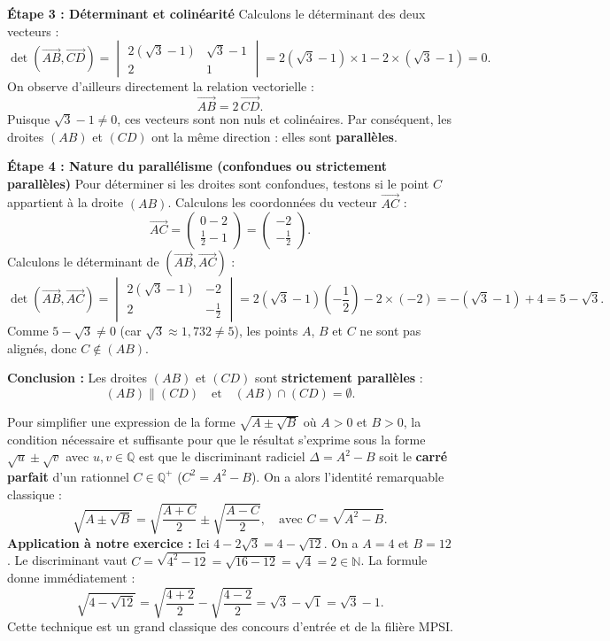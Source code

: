\documentclass[11pt,a4paper]{article}
\newcommand{\N}{\mathbb{N}}
\newcommand{\Q}{\mathbb{Q}}
\newcommand{\vect}[1]{\overrightarrow{#1}}
\renewcommand{\det}{\operatorname{det}}
\begin{document}
\begin{correctionbox}
\textbf{Étape 3 : Déterminant et colinéarité}
Calculons le déterminant des deux vecteurs :
\[
\det(\vect{AB}, \vect{CD}) = \begin{vmatrix} 2(\sqrt{3} - 1) & \sqrt{3} - 1 \\ 2 & 1 \end{vmatrix} = 2(\sqrt{3} - 1) \times 1 - 2 \times (\sqrt{3} - 1) = 0.
\]
On observe d'ailleurs directement la relation vectorielle :
\[
\vect{AB} = 2\,\vect{CD}.
\]
Puisque $\sqrt{3} - 1 \neq 0$, ces vecteurs sont non nuls et colinéaires. Par conséquent, les droites $(AB)$ et $(CD)$ ont la même direction : elles sont \textbf{parallèles}.

\textbf{Étape 4 : Nature du parallélisme (confondues ou strictement parallèles)}
Pour déterminer si les droites sont confondues, testons si le point $C$ appartient à la droite $(AB)$.
Calculons les coordonnées du vecteur $\vect{AC}$ :
\[
\vect{AC} = \begin{pmatrix} 0 - 2 \\ \frac{1}{2} - 1 \end{pmatrix} = \begin{pmatrix} -2 \\ -\frac{1}{2} \end{pmatrix}.
\]
Calculons le déterminant de $(\vect{AB}, \vect{AC})$ :
\[
\det(\vect{AB}, \vect{AC}) = \begin{vmatrix} 2(\sqrt{3} - 1) & -2 \\ 2 & -\frac{1}{2} \end{vmatrix} = 2(\sqrt{3} - 1)\left(-\frac{1}{2}\right) - 2 \times (-2) = -(\sqrt{3} - 1) + 4 = 5 - \sqrt{3}.
\]
Comme $5 - \sqrt{3} \neq 0$ (car $\sqrt{3} \approx 1{,}732 \neq 5$), les points $A$, $B$ et $C$ ne sont pas alignés, donc $C \notin (AB)$.

\textbf{Conclusion :} Les droites $(AB)$ et $(CD)$ sont \textbf{strictement parallèles} :
\[
(AB) \parallel (CD) \quad \text{et} \quad (AB) \cap (CD) = \emptyset.
\]
\end{correctionbox}

\begin{methodbox}
Pour simplifier une expression de la forme $\sqrt{A \pm \sqrt{B}}$ où $A > 0$ et $B > 0$, la condition nécessaire et suffisante pour que le résultat s'exprime sous la forme $\sqrt{u} \pm \sqrt{v}$ avec $u, v \in \Q$ est que le discriminant radiciel $\Delta = A^2 - B$ soit le \textbf{carré parfait} d'un rationnel $C \in \Q^+$ ($C^2 = A^2 - B$). On a alors l'identité remarquable classique :
\[
\sqrt{A \pm \sqrt{B}} = \sqrt{\frac{A + C}{2}} \pm \sqrt{\frac{A - C}{2}}, \quad \text{avec } C = \sqrt{A^2 - B}.
\]
\textbf{Application à notre exercice :} Ici $4 - 2\sqrt{3} = 4 - \sqrt{12}$. On a $A = 4$ et $B = 12$.
Le discriminant vaut $C = \sqrt{4^2 - 12} = \sqrt{16 - 12} = \sqrt{4} = 2 \in \N$.
La formule donne immédiatement :
\[
\sqrt{4 - \sqrt{12}} = \sqrt{\frac{4 + 2}{2}} - \sqrt{\frac{4 - 2}{2}} = \sqrt{3} - \sqrt{1} = \sqrt{3} - 1.
\]
Cette technique est un grand classique des concours d'entrée et de la filière MPSI.
\end{methodbox}
\end{document}
